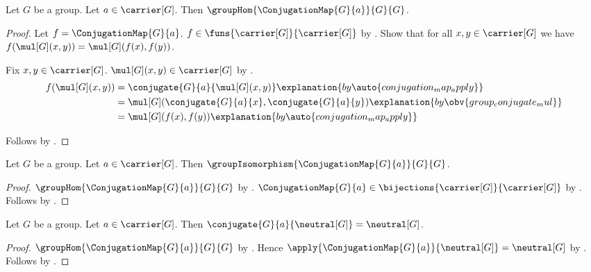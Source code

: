 \begin{theorem}\label{conjugation_map_group_hom}
    Let $G$ be a group.
    Let $a\in\carrier[G]$.
    Then $\groupHom{\ConjugationMap{G}{a}}{G}{G}$.
\end{theorem}
\begin{proof}
    Let $f=\ConjugationMap{G}{a}$.
    $f\in\funs{\carrier[G]}{\carrier[G]}$ by
        .
    Show that for all $x,y\in\carrier[G]$ we have
        $f(\mul[G](x,y))=\mul[G](f(x),f(y))$.
    \begin{subproof}
        Fix $x,y\in\carrier[G]$.
        $\mul[G](x,y)\in\carrier[G]$ by
            .
        \begin{align*}
            f(\mul[G](x,y))
                &= \conjugate{G}{a}{\mul[G](x,y)}
                    \explanation{by \auto{conjugation_map_apply}}
                \\
                &= \mul[G](\conjugate{G}{a}{x},\conjugate{G}{a}{y})
                    \explanation{by \obv{group_conjugate_mul}}
                \\
                &= \mul[G](f(x),f(y))
                    \explanation{by \auto{conjugation_map_apply}}
        \end{align*}
    \end{subproof}
    Follows by .
\end{proof}

\begin{theorem}\label{conjugation_map_group_isomorphism}
    Let $G$ be a group.
    Let $a\in\carrier[G]$.
    Then $\groupIsomorphism{\ConjugationMap{G}{a}}{G}{G}$.
\end{theorem}
\begin{proof}
    $\groupHom{\ConjugationMap{G}{a}}{G}{G}$ by
        .
    $\ConjugationMap{G}{a}\in
        \bijections{\carrier[G]}{\carrier[G]}$ by
        .
    Follows by .
\end{proof}

\begin{proposition}\label{group_conjugate_neutral}
    Let $G$ be a group.
    Let $a\in\carrier[G]$.
    Then $\conjugate{G}{a}{\neutral[G]}=\neutral[G]$.
\end{proposition}
\begin{proof}
    $\groupHom{\ConjugationMap{G}{a}}{G}{G}$ by
        .
    Hence
        $\apply{\ConjugationMap{G}{a}}{\neutral[G]}=\neutral[G]$ by
        .
    Follows by
        .
\end{proof}

